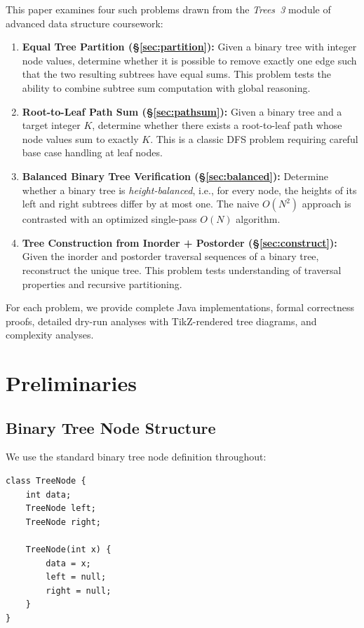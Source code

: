 \documentclass[10pt,journal,compsoc,onecolumn]{IEEEtran}
\begin{document}
This paper examines four such problems drawn from the \emph{Trees~3} module of advanced data structure coursework:

\begin{enumerate}
    \item \textbf{Equal Tree Partition (\S\ref{sec:partition}):} Given a binary tree with integer node values, determine whether it is possible to remove exactly one edge such that the two resulting subtrees have equal sums. This problem tests the ability to combine subtree sum computation with global reasoning.
    
    \item \textbf{Root-to-Leaf Path Sum (\S\ref{sec:pathsum}):} Given a binary tree and a target integer $K$, determine whether there exists a root-to-leaf path whose node values sum to exactly $K$. This is a classic DFS problem requiring careful base case handling at leaf nodes.
    
    \item \textbf{Balanced Binary Tree Verification (\S\ref{sec:balanced}):} Determine whether a binary tree is \emph{height-balanced}, i.e., for every node, the heights of its left and right subtrees differ by at most one. The naive $O(N^2)$ approach is contrasted with an optimized single-pass $O(N)$ algorithm.
    
    \item \textbf{Tree Construction from Inorder + Postorder (\S\ref{sec:construct}):} Given the inorder and postorder traversal sequences of a binary tree, reconstruct the unique tree. This problem tests understanding of traversal properties and recursive partitioning.
\end{enumerate}

For each problem, we provide complete Java implementations, formal correctness proofs, detailed dry-run analyses with TikZ-rendered tree diagrams, and complexity analyses.

\section{Preliminaries}
\label{sec:prelim}

\subsection{Binary Tree Node Structure}

We use the standard binary tree node definition throughout:

\begin{verbatim}
class TreeNode {
    int data;
    TreeNode left;
    TreeNode right;

    TreeNode(int x) {
        data = x;
        left = null;
        right = null;
    }
}
\end{verbatim}
\end{document}

